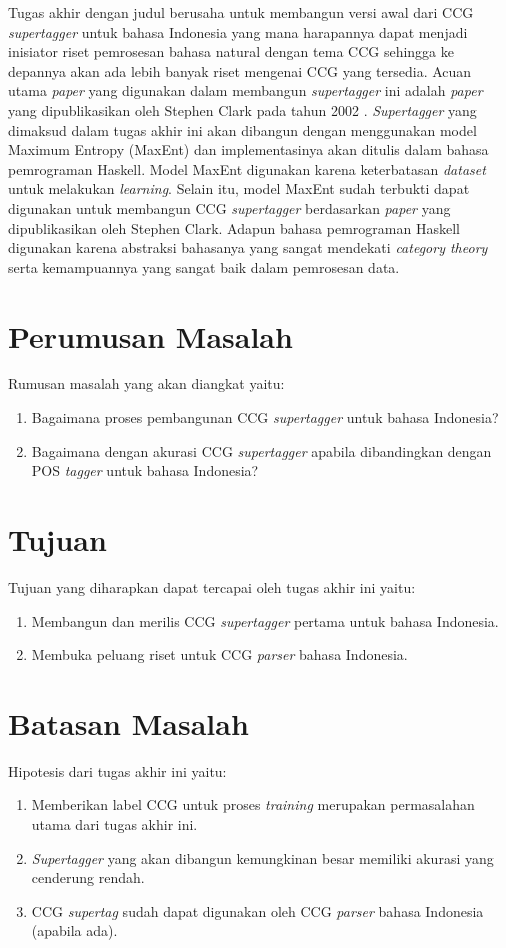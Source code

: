Tugas akhir dengan judul \say{\Title} berusaha untuk membangun versi awal dari CCG
\textit{supertagger} untuk bahasa Indonesia yang mana harapannya dapat menjadi inisiator riset
pemrosesan bahasa natural dengan tema CCG sehingga ke depannya akan ada lebih banyak riset
mengenai CCG yang tersedia.
Acuan utama \textit{paper} yang digunakan dalam membangun \textit{supertagger} ini adalah
\textit{paper} yang dipublikasikan oleh Stephen Clark pada tahun 2002 \cite{clark-2002-supertagging}.
\textit{Supertagger} yang dimaksud dalam tugas akhir ini akan dibangun dengan menggunakan model
Maximum Entropy (MaxEnt) dan implementasinya akan ditulis dalam bahasa pemrograman Haskell.
Model MaxEnt digunakan karena keterbatasan \textit{dataset} untuk melakukan \textit{learning}.
Selain itu, model MaxEnt sudah terbukti dapat digunakan untuk membangun CCG \textit{supertagger}
\cite{clark-2002-supertagging} berdasarkan \textit{paper} yang dipublikasikan oleh Stephen Clark.
Adapun bahasa pemrograman Haskell digunakan karena abstraksi bahasanya yang sangat mendekati
\textit{category theory} serta kemampuannya yang sangat baik dalam pemrosesan data.

\section{Perumusan Masalah}
Rumusan masalah yang akan diangkat yaitu:
\begin{enumerate}
    \item Bagaimana proses pembangunan CCG \textit{supertagger} untuk bahasa Indonesia?
    \item Bagaimana dengan akurasi CCG \textit{supertagger} apabila dibandingkan dengan
      POS \textit{tagger} untuk bahasa Indonesia?
\end{enumerate}
\section{Tujuan}
Tujuan yang diharapkan dapat tercapai oleh tugas akhir ini yaitu:
\begin{enumerate}
    \item Membangun dan merilis CCG \textit{supertagger} pertama untuk bahasa Indonesia.
    \item Membuka peluang riset untuk CCG \textit{parser} bahasa Indonesia.
\end{enumerate}
\section{Batasan Masalah}
Hipotesis dari tugas akhir ini yaitu:
\begin{enumerate}
    \item Memberikan label CCG untuk proses \textit{training} merupakan permasalahan utama dari tugas
      akhir ini.
    \item \textit{Supertagger} yang akan dibangun kemungkinan besar memiliki akurasi yang cenderung
      rendah.
    \item CCG \textit{supertag} sudah dapat digunakan oleh CCG \textit{parser} bahasa Indonesia
      (apabila ada).
\end{enumerate}

